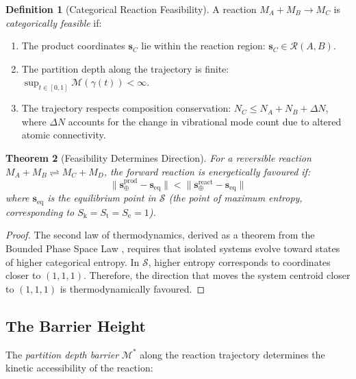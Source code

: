 \documentclass[11pt,twocolumn,a4paper]{article}
\newtheorem{theorem}{Theorem}[section]
\theoremstyle{definition}
\newtheorem{definition}[theorem]{Definition}
\theoremstyle{remark}
\newcommand{\Sk}{S_{\mathrm{k}}}
\newcommand{\St}{S_{\mathrm{t}}}
\newcommand{\Se}{S_{\mathrm{e}}}
\newcommand{\Sspace}{\mathcal{S}}
\newcommand{\Depth}{\mathcal{M}}
\begin{document}
\begin{definition}[Categorical Reaction Feasibility]
\label{def:feasibility}
A reaction $M_A + M_B \to M_C$ is \emph{categorically feasible} if:
\begin{enumerate}[nosep]
\item The product coordinates $\mathbf{s}_C$ lie within the reaction region: $\mathbf{s}_C \in \mathcal{R}(A, B)$.
\item The partition depth along the trajectory is finite: $\sup_{t \in [0,1]} \Depth(\gamma(t)) < \infty$.
\item The trajectory respects composition conservation: $N_C \leq N_A + N_B + \Delta N$, where $\Delta N$ accounts for the change in vibrational mode count due to altered atomic connectivity.
\end{enumerate}
\end{definition}

\begin{theorem}[Feasibility Determines Direction]
\label{thm:direction}
For a reversible reaction $M_A + M_B \rightleftharpoons M_C + M_D$, the forward reaction is energetically favoured if:
\begin{equation}
\|\mathbf{s}_{\oplus}^{\mathrm{prod}} - \mathbf{s}_{\mathrm{eq}}\| < \|\mathbf{s}_{\oplus}^{\mathrm{react}} - \mathbf{s}_{\mathrm{eq}}\|
\label{eq:direction}
\end{equation}
where $\mathbf{s}_{\mathrm{eq}}$ is the equilibrium point in $\Sspace$ (the point of maximum entropy, corresponding to $\Sk = \St = \Se = 1$).
\end{theorem}

\begin{proof}
The second law of thermodynamics, derived as a theorem from the Bounded Phase Space Law \citep{sachikonye2025a}, requires that isolated systems evolve toward states of higher categorical entropy. In $\Sspace$, higher entropy corresponds to coordinates closer to $(1, 1, 1)$. Therefore, the direction that moves the system centroid closer to $(1, 1, 1)$ is thermodynamically favoured.
\end{proof}

\subsection{The Barrier Height}

The \emph{partition depth barrier} $\Depth^*$ along the reaction trajectory determines the kinetic accessibility of the reaction:
\end{document}
